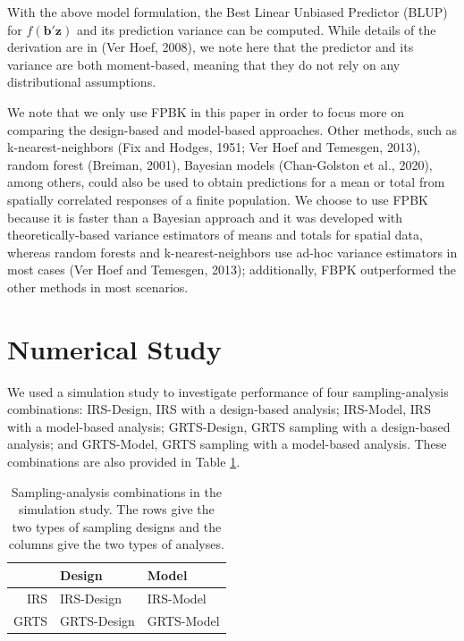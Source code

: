 \documentclass[]{elsarticle} %
\begin{document}
With the above model formulation, the Best Linear Unbiased Predictor
(BLUP) for \(f(\mathbf{b}'\mathbf{z})\) and its prediction variance can
be computed. While details of the derivation are in (Ver Hoef, 2008), we
note here that the predictor and its variance are both moment-based,
meaning that they do not rely on any distributional assumptions.

We note that we only use FPBK in this paper in order to focus more on
comparing the design-based and model-based approaches. Other methods,
such as k-nearest-neighbors (Fix and Hodges, 1951; Ver Hoef and
Temesgen, 2013), random forest (Breiman, 2001), Bayesian models
(Chan-Golston et al., 2020), among others, could also be used to obtain
predictions for a mean or total from spatially correlated responses of a
finite population. We choose to use FPBK because it is faster than a
Bayesian approach and it was developed with theoretically-based variance
estimators of means and totals for spatial data, whereas random forests
and k-nearest-neighbors use ad-hoc variance estimators in most cases
(Ver Hoef and Temesgen, 2013); additionally, FBPK outperformed the other
methods in most scenarios.

\hypertarget{sec:numstudy}{%
\section{Numerical Study}\label{sec:numstudy}}

We used a simulation study to investigate performance of four
sampling-analysis combinations: IRS-Design, IRS with a design-based
analysis; IRS-Model, IRS with a model-based analysis; GRTS-Design, GRTS
sampling with a design-based analysis; and GRTS-Model, GRTS sampling
with a model-based analysis. These combinations are also provided in
Table \ref{tab:designanalysis}.

\begin{table}[ht]
\centering
\begin{tabular}{r|ll}
  \hline
 & Design & Model \\ 
  \hline
IRS & IRS-Design & IRS-Model \\ 
  GRTS & GRTS-Design & GRTS-Model \\ 
   \hline
\end{tabular}
\caption{\label{tab:designanalysis} Sampling-analysis combinations in the simulation study. The rows give the two types of sampling designs and the columns give the two types of analyses.} 
\end{table}
\end{document}
